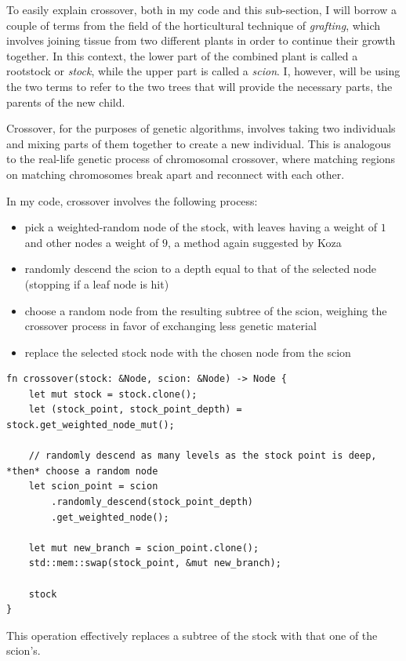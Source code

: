 \documentclass{report}
\begin{document}
To easily explain crossover, both in my code and this sub-section, I will borrow a couple of terms from the field of the horticultural technique of \emph{grafting}, which involves joining tissue from two different plants in order to continue their growth together. In this context, the lower part of the combined plant is called a rootstock or \emph{stock}, while the upper part is called a \emph{scion}. I, however, will be using the two terms to refer to the two trees that will provide the necessary parts, the parents of the new child.

Crossover, for the purposes of genetic algorithms, involves taking two individuals and mixing parts of them together to create a new individual. This is analogous to the real-life genetic process of chromosomal crossover, where matching regions on matching chromosomes break apart and reconnect with each other.

In my code, crossover involves the following process:
\begin{itemize}
    \label{weighted_random}
    \item pick a weighted-random node of the stock, with leaves having a weight of $1$ and other nodes a weight of $9$, a method again suggested by Koza\cite{koza}
    \item randomly descend the scion to a depth equal to that of the selected node (stopping if a leaf node is hit)
    \item choose a random node from the resulting subtree of the scion, weighing the crossover process in favor of exchanging less genetic material
    \item replace the selected stock node with the chosen node from the scion
\end{itemize}

\begin{verbatim}
fn crossover(stock: &Node, scion: &Node) -> Node {
    let mut stock = stock.clone();
    let (stock_point, stock_point_depth) = stock.get_weighted_node_mut();

    // randomly descend as many levels as the stock point is deep, *then* choose a random node
    let scion_point = scion
        .randomly_descend(stock_point_depth)
        .get_weighted_node();

    let mut new_branch = scion_point.clone();
    std::mem::swap(stock_point, &mut new_branch);

    stock
}
\end{verbatim}

This operation effectively replaces a subtree of the stock with that one of the scion's.
\end{document}
